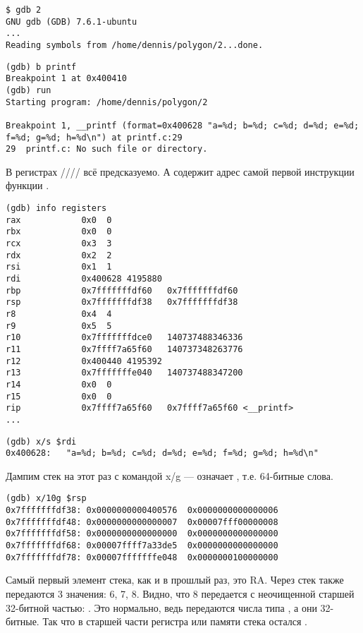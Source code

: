 \begin{lstlisting}
$ gdb 2
GNU gdb (GDB) 7.6.1-ubuntu
...
Reading symbols from /home/dennis/polygon/2...done.
\end{lstlisting}

\begin{lstlisting}[caption=ставим точку останова на \printf{,} запускаем]
(gdb) b printf
Breakpoint 1 at 0x400410
(gdb) run
Starting program: /home/dennis/polygon/2 

Breakpoint 1, __printf (format=0x400628 "a=%d; b=%d; c=%d; d=%d; e=%d; f=%d; g=%d; h=%d\n") at printf.c:29
29	printf.c: No such file or directory.
\end{lstlisting}

В регистрах \RSI/\RDX/\RCX// 
всё предсказуемо.
А \RIP содержит адрес самой первой инструкции функции \printf{}.

\begin{lstlisting}
(gdb) info registers
rax            0x0	0
rbx            0x0	0
rcx            0x3	3
rdx            0x2	2
rsi            0x1	1
rdi            0x400628	4195880
rbp            0x7fffffffdf60	0x7fffffffdf60
rsp            0x7fffffffdf38	0x7fffffffdf38
r8             0x4	4
r9             0x5	5
r10            0x7fffffffdce0	140737488346336
r11            0x7ffff7a65f60	140737348263776
r12            0x400440	4195392
r13            0x7fffffffe040	140737488347200
r14            0x0	0
r15            0x0	0
rip            0x7ffff7a65f60	0x7ffff7a65f60 <__printf>
...
\end{lstlisting}

\begin{lstlisting}[caption=смотрим на строку формата]
(gdb) x/s $rdi
0x400628:	"a=%d; b=%d; c=%d; d=%d; e=%d; f=%d; g=%d; h=%d\n"
\end{lstlisting}

Дампим стек на этот раз с командой x/g ---  означает , т.е. 64-битные слова.

\begin{lstlisting}
(gdb) x/10g $rsp
0x7fffffffdf38:	0x0000000000400576	0x0000000000000006
0x7fffffffdf48:	0x0000000000000007	0x00007fff00000008
0x7fffffffdf58:	0x0000000000000000	0x0000000000000000
0x7fffffffdf68:	0x00007ffff7a33de5	0x0000000000000000
0x7fffffffdf78:	0x00007fffffffe048	0x0000000100000000
\end{lstlisting}

Самый первый элемент стека, как и в прошлый раз, это \ac{RA}.
Через стек также передаются 3 значения: 6, 7, 8.
Видно, что 8 передается с неочищенной старшей 32-битной частью: .
Это нормально, ведь передаются числа типа \Tint, а они 32-битные.
Так что в старшей части регистра или памяти стека остался .


